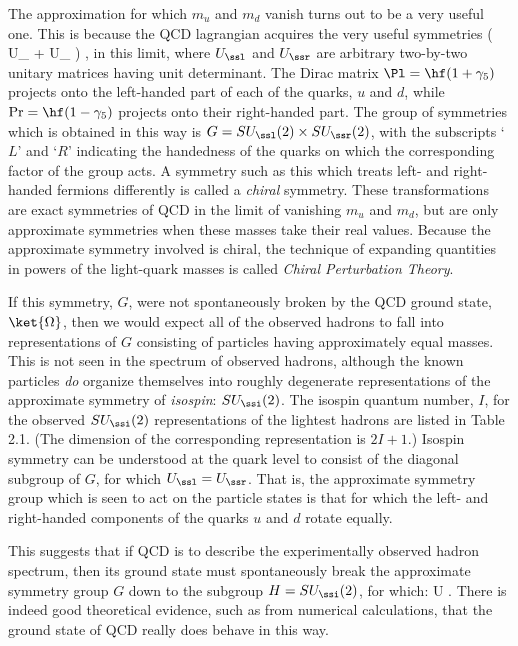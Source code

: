 \documentclass[12pt]{report}
\begin{document}
The approximation for which $m_u$ and $m_d$ vanish turns
out to be a very useful one. This is because the QCD
lagrangian acquires the very useful symmetries
%
\eq
\label{chiralsym}
 \to \Bigl( U_\ssl \; \Pl + 
U_\ssr \; \Pr \Bigr) \;
,
\eeq
%
in this limit, where $U_\ssl$ and $U_\ssr$ are arbitrary
two-by-two unitary matrices having unit determinant. The
Dirac matrix $\Pl = \hf(1+ \gamma_5)$ projects onto the 
left-handed part of each of the quarks, $u$ and $d$, 
while $\Pr = \hf(1
- \gamma_5)$ projects onto their right-handed part. The
group of symmetries which is obtained in this way is $G =
SU_\ssl(2) \times 
SU_\ssr(2)$, with the subscripts `$L$' and `$R$' indicating
the handedness of the quarks on which the corresponding
factor of the group acts. A symmetry such as this which
treats left- and right-handed fermions differently is
called a {\em chiral} symmetry. These transformations are
exact symmetries of QCD in the limit of vanishing $m_u$ and
$m_d$, but are only approximate symmetries when these masses
take their real values. Because the approximate symmetry
involved is chiral, the technique of expanding quantities
in powers of the light-quark masses is called {\em Chiral
Perturbation Theory}.

If this symmetry, $G$, were not spontaneously broken by the
QCD ground state, $\ket{\Omega}$, then we would expect all
of the observed hadrons to fall into representations of $G$
consisting of particles having approximately equal masses.
This is not seen in the spectrum of observed hadrons,
although the known particles 
{\em do} organize themselves into roughly degenerate
representations of the approximate symmetry of {\em
isospin}: $SU_\ssi(2)$. The isospin quantum number, $I$,
for the observed $SU_\ssi(2)$ representations of the
lightest hadrons are listed in Table 2.1. (The dimension of
the corresponding representation is $2I+1$.) Isospin
symmetry can be understood at the quark level to consist of
the diagonal subgroup of $G$, for which $U_\ssl = U_\ssr$.
That is, the approximate symmetry group which is seen to
act on the particle states is that for which the left- and
right-handed components of the quarks $u$ and $d$ rotate
equally.

This suggests that if QCD is to describe the experimentally
observed hadron spectrum, then its ground state must
spontaneously break the approximate symmetry group $G$ down
to the subgroup $H = SU_\ssi(2)$, for which:
%
\eq
\label{isospintrans}
 \to U \; .  \eeq
%
There is indeed good theoretical evidence, such as from
numerical calculations, that the ground state of QCD really
does behave in this way.
\end{document}
